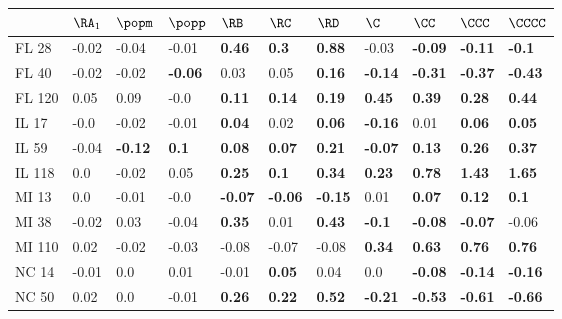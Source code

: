 \begin{tabular}{lllllllllll}
\toprule
{} & $\RA_1$ &         $\popm$ &         $\popp$ &           $\RB$ &           $\RC$ &           $\RD$ &            $\C$ &           $\CC$ &          $\CCC$ &         $\CCCC$ \\
\midrule
FL 28   &   -0.02 &           -0.04 &           -0.01 &   \textbf{0.46} &    \textbf{0.3} &   \textbf{0.88} &           -0.03 &  \textbf{-0.09} &  \textbf{-0.11} &   \textbf{-0.1} \\
FL 40   &   -0.02 &           -0.02 &  \textbf{-0.06} &            0.03 &            0.05 &   \textbf{0.16} &  \textbf{-0.14} &  \textbf{-0.31} &  \textbf{-0.37} &  \textbf{-0.43} \\
FL 120  &    0.05 &            0.09 &            -0.0 &   \textbf{0.11} &   \textbf{0.14} &   \textbf{0.19} &   \textbf{0.45} &   \textbf{0.39} &   \textbf{0.28} &   \textbf{0.44} \\
IL 17   &    -0.0 &           -0.02 &           -0.01 &   \textbf{0.04} &            0.02 &   \textbf{0.06} &  \textbf{-0.16} &            0.01 &   \textbf{0.06} &   \textbf{0.05} \\
IL 59   &   -0.04 &  \textbf{-0.12} &    \textbf{0.1} &   \textbf{0.08} &   \textbf{0.07} &   \textbf{0.21} &  \textbf{-0.07} &   \textbf{0.13} &   \textbf{0.26} &   \textbf{0.37} \\
IL 118  &     0.0 &           -0.02 &            0.05 &   \textbf{0.25} &    \textbf{0.1} &   \textbf{0.34} &   \textbf{0.23} &   \textbf{0.78} &   \textbf{1.43} &   \textbf{1.65} \\
MI 13   &     0.0 &           -0.01 &            -0.0 &  \textbf{-0.07} &  \textbf{-0.06} &  \textbf{-0.15} &            0.01 &   \textbf{0.07} &   \textbf{0.12} &    \textbf{0.1} \\
MI 38   &   -0.02 &            0.03 &           -0.04 &   \textbf{0.35} &            0.01 &   \textbf{0.43} &   \textbf{-0.1} &  \textbf{-0.08} &  \textbf{-0.07} &           -0.06 \\
MI 110  &    0.02 &           -0.02 &           -0.03 &           -0.08 &           -0.07 &           -0.08 &   \textbf{0.34} &   \textbf{0.63} &   \textbf{0.76} &   \textbf{0.76} \\
NC 14   &   -0.01 &             0.0 &            0.01 &           -0.01 &   \textbf{0.05} &            0.04 &             0.0 &  \textbf{-0.08} &  \textbf{-0.14} &  \textbf{-0.16} \\
NC 50   &    0.02 &             0.0 &           -0.01 &   \textbf{0.26} &   \textbf{0.22} &   \textbf{0.52} &  \textbf{-0.21} &  \textbf{-0.53} &  \textbf{-0.61} &  \textbf{-0.66} \\

\end{tabular}
